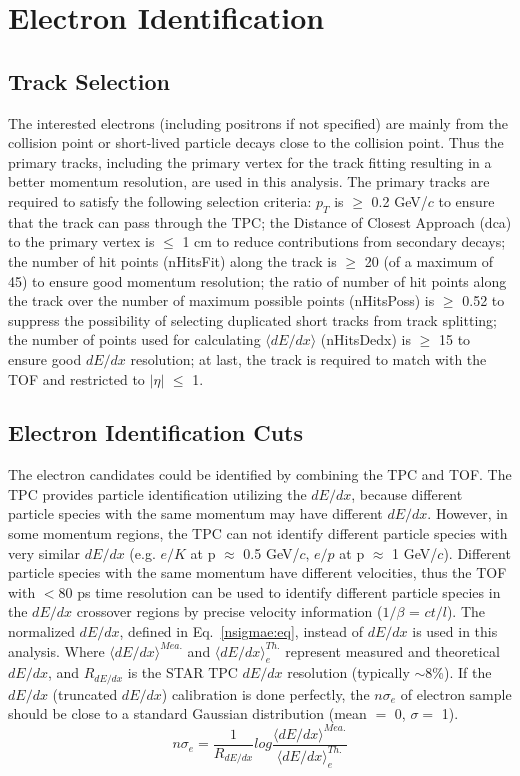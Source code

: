 \section{Electron Identification}

\subsection{Track Selection}
The interested electrons (including positrons if not specified) are mainly from the collision point or short-lived particle decays close to the collision point. Thus the primary tracks, including the primary vertex for the track fitting resulting in a better momentum resolution, are used in this analysis. The primary tracks are required to satisfy the following selection criteria: $p_{T}$ is $\geq$ 0.2 GeV/$c$ to ensure that the track can pass through the TPC; the Distance of Closest Approach (dca) to the primary vertex is $\leq$ 1 cm to reduce contributions from secondary decays; the number of hit points (nHitsFit) along the track is $\geq$ 20 (of a maximum of 45) to ensure good momentum resolution; the ratio of number of hit points along the track over the number of maximum possible points (nHitsPoss) is $\geq$ 0.52 to suppress the possibility of selecting duplicated short tracks from track splitting; the number of points used for calculating $\langle$$dE/dx$$\rangle$ (nHitsDedx) is $\geq$ 15 to ensure good $dE/dx$ resolution; at last, the track is required to match with the TOF and restricted to $|\eta|$ $\leq$ 1.
 
\subsection{Electron Identification Cuts}

The electron candidates could be identified by combining the TPC and TOF. The TPC provides particle identification utilizing the $dE/dx$, because different particle species with the same momentum may have different $dE/dx$. However, in some momentum regions, the TPC can not identify different particle species with very similar $dE/dx$ (e.g. $e/K$ at p $\approx$ 0.5 GeV/$c$, $e/p$ at p $\approx$ 1 GeV/$c$). Different particle species with the same momentum have different velocities, thus the TOF with $<$80 ps time resolution can be used to identify different particle species in the $dE/dx$ crossover regions by precise velocity information ($1/\beta$ = $ct/l$). The normalized $dE/dx$, defined in Eq.~\ref{nsigmae:eq}, instead of $dE/dx$ is used in this analysis. Where $\langle{dE/dx}\rangle^{Mea.}$ and $\langle{dE/dx}\rangle^{Th.}_{e}$ represent measured and theoretical $dE/dx$, and $R_{dE/dx}$ is the STAR TPC $dE/dx$ resolution (typically $\sim$8\%). If the $dE/dx$ (truncated $dE/dx$) calibration is done perfectly, the $n\sigma_{e}$ of electron sample should be close to a standard Gaussian distribution (mean $=$ 0, $\sigma = $ 1).
\begin{equation}
n\sigma_e = \frac{1}{R_{dE/dx}}log\frac{\langle{dE/dx}\rangle^{Mea.}}{\langle{dE/dx}\rangle^{Th.}_{e}}
\label{nsigmae:eq}
\end{equation}


